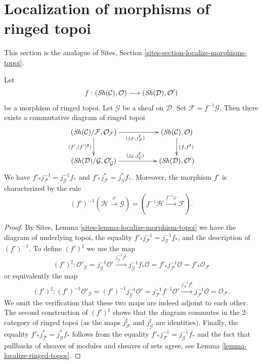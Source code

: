 \section{Localization of morphisms of ringed topoi}
\label{section-localize-morphisms-ringed-topoi}

\noindent
This section is the analogue of
Sites, Section \ref{sites-section-localize-morphisms-topoi}.

\begin{lemma}
\label{lemma-localize-morphism-ringed-topoi}
Let
$$
f :
(\mathop{\mathit{Sh}}\nolimits(\mathcal{C}), \mathcal{O})
\longrightarrow
(\mathop{\mathit{Sh}}\nolimits(\mathcal{D}), \mathcal{O}')
$$
be a morphism of ringed topoi. Let $\mathcal{G}$ be a sheaf on $\mathcal{D}$.
Set $\mathcal{F} = f^{-1}\mathcal{G}$.
Then there exists a commutative diagram of ringed topoi
$$
\xymatrix{
(\Sh(\mathcal{C})/\mathcal{F}, \mathcal{O}_\mathcal{F})
\ar[rr]_{(j_\mathcal{F}, j_\mathcal{F}^\sharp)}
\ar[d]_{(f', (f')^\sharp)} & &
(\Sh(\mathcal{C}), \mathcal{O}) \ar[d]^{(f, f^\sharp)} \\
(\Sh(\mathcal{D})/\mathcal{G}, \mathcal{O}'_\mathcal{G})
\ar[rr]^{(j_\mathcal{G}, j_\mathcal{G}^\sharp)} & &
(\Sh(\mathcal{D}), \mathcal{O}')
}
$$
We have $f'_*j_\mathcal{F}^{-1} = j_\mathcal{G}^{-1}f_*$
and $f'_*j_\mathcal{F}^* = j_\mathcal{G}^*f_*$. Moreover, the
morphism $f'$ is characterized by the rule
$$
(f')^{-1}(\mathcal{H} \xrightarrow{\varphi} \mathcal{G})
=
(f^{-1}\mathcal{H} \xrightarrow{f^{-1}\varphi} \mathcal{F}).
$$
\end{lemma}

\begin{proof}
By
Sites, Lemma \ref{sites-lemma-localize-morphism-topoi}
we have the diagram of underlying topoi, the
equality $f'_*j_\mathcal{F}^{-1} = j_\mathcal{G}^{-1}f_*$, and
the description of $(f')^{-1}$.
To define $(f')^\sharp$ we use the map
$$
(f')^\sharp :
\mathcal{O}'_\mathcal{G} =
j_\mathcal{G}^{-1} \mathcal{O}'
\xrightarrow{j_\mathcal{G}^{-1}f^\sharp}
j_\mathcal{G}^{-1} f_*\mathcal{O} =
f'_* j_\mathcal{F}^{-1}\mathcal{O} =
f'_* \mathcal{O}_\mathcal{F}
$$
or equivalently the map
$$
(f')^\sharp :
(f')^{-1}\mathcal{O}'_\mathcal{G} =
(f')^{-1}j_\mathcal{G}^{-1} \mathcal{O}' =
j_\mathcal{F}^{-1}f^{-1}\mathcal{O}'
\xrightarrow{j_\mathcal{F}^{-1}f^\sharp}
j_\mathcal{F}^{-1} \mathcal{O} =
\mathcal{O}_\mathcal{F}.
$$
We omit the verification that these two maps are indeed adjoint
to each other. The second construction of $(f')^\sharp$ shows that
the diagram commutes in the $2$-category of ringed topoi (as the
maps $j_\mathcal{F}^\sharp$ and $j_\mathcal{G}^\sharp$ are identities).
Finally, the equality $f'_*j_\mathcal{F}^* = j_\mathcal{G}^*f_*$
follows from the equality
$f'_*j_\mathcal{F}^{-1} = j_\mathcal{G}^{-1}f_*$
and the fact that pullbacks of sheaves of modules and sheaves of sets agree,
see
Lemma \ref{lemma-localize-ringed-topos}.
\end{proof}

